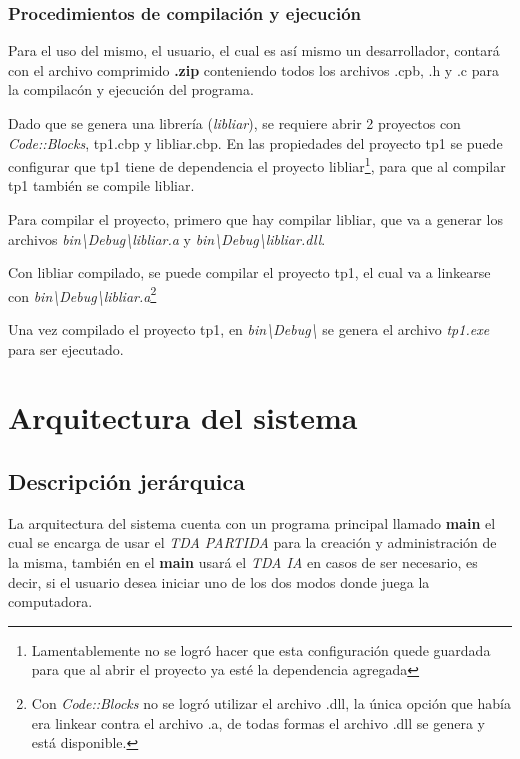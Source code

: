 \documentclass[12pt,twocolum,a4paper]{article}
\begin{document}
\subsubsection{Procedimientos de compilaci\'on y ejecuci\'on}
    Para el uso del mismo, el usuario, el cual es as\'i mismo un desarrollador, contar\'a con el archivo comprimido {\bf .zip} conteniendo todos los archivos .cpb, .h y .c para la compilac\'on y ejecuci\'on del programa.
		
		Dado que se genera una librer\'ia (\emph{libliar}), se requiere abrir 2 proyectos con \emph{Code::Blocks}, tp1.cbp y libliar.cbp. En las propiedades del proyecto tp1 se puede configurar que tp1 tiene de dependencia el proyecto libliar\footnote{Lamentablemente no se logr\'o hacer que esta configuraci\'on quede guardada para que al abrir el proyecto ya est\'e la dependencia agregada}, para que al compilar tp1 tambi\'en se compile libliar.
		
		Para compilar el proyecto, primero que hay compilar libliar, que va a generar los archivos \emph{bin\textbackslash Debug\textbackslash libliar.a} y \emph{bin\textbackslash Debug\textbackslash libliar.dll}.
		
		Con libliar compilado, se puede compilar el proyecto tp1, el cual va a linkearse con \emph{bin\textbackslash Debug\textbackslash libliar.a}\footnote{Con \emph{Code::Blocks} no se logr\'o utilizar el archivo .dll, la \'unica opci\'on que hab\'ia era linkear contra el archivo .a, de todas formas el archivo .dll se genera y est\'a disponible.}
		
		Una vez compilado el proyecto tp1, en \emph{bin\textbackslash Debug\textbackslash} se genera el archivo \emph{tp1.exe} para ser ejecutado.

\section{Arquitectura del sistema}

\subsection{Descripci\'on jer\'arquica}
    La arquitectura del sistema cuenta con un programa principal llamado {\bf main} el cual se encarga de usar el {\itshape TDA PARTIDA} para la creaci\'on y administraci\'on de la misma, tambi\'en en el {\bf main} usar\'a el {\itshape TDA IA} en casos de ser necesario, es decir, si el usuario desea iniciar uno de los dos modos donde juega la computadora.
\end{document}
